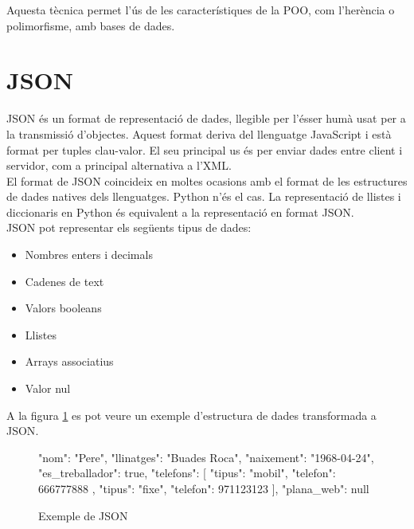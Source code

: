 Aquesta tècnica permet l'ús de les característiques de la \ac{POO}, com l'herència o polimorfisme,  amb bases de dades.

\section{\ac{JSON}}
\ac{JSON} és un format de representació de dades, llegible per l'ésser humà usat per a la transmissió d'objectes. Aquest format deriva del llenguatge JavaScript i està format per tuples clau-valor. El seu principal us és per enviar dades entre client i servidor, com a principal alternativa a l'\ac{XML}.\\


El format de \ac{JSON} coincideix en moltes ocasions amb el format de les estructures de dades natives dels llenguatges. Python n'és el cas. La representació de llistes i diccionaris en Python és equivalent a la representació en format \ac{JSON}.\\

\ac{JSON} pot representar els següents tipus de dades:

\begin{itemize}
	\item Nombres enters i decimals
	\item Cadenes de text
	\item Valors booleans
	\item Llistes
	\item Arrays associatius
	\item Valor nul
\end{itemize}

A la figura \ref{fig:json_exemple} es pot veure un exemple d'estructura de dades transformada a \ac{JSON}.

\begin{figure}[h!]
	\begin{python}
{
	"nom": "Pere",
	"llinatges": "Buades Roca",
	"naixement": "1968-04-24",
	"es_treballador": true, 
	"telefons": [
		{
			"tipus": "mobil",
			"telefon": 666777888
		},
		{
			"tipus": "fixe",
			"telefon": 971123123
		}
	],
	"plana_web": null
}
	\end{python}
	\caption{Exemple de \ac{JSON}}
	\label{fig:json_exemple}
\end{figure}
